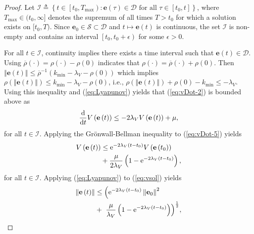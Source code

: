 \documentclass[letterpaper, 10 pt, conference]{ieeeconf}
\theoremstyle{definition}
\begin{document}
\begin{proof}
Let $\mathcal{I}\triangleq\left\{ t\in\left[t_{0},T_{\max}\right):\mathbf{e}\left(\tau\right)\in\mathcal{D}\text{ for all }\tau\in\left[t_{0},t\right]\right\} $, where $T_{\max}\in(t_{0},\infty ]$ denotes the supremum of all times $T>t_{0}$ for which a solution exists on $[t_{0},T)$. Since $\mathbf{e}_{0} \in\mathcal{S}\subset\mathcal{D}$
and $t\mapsto \mathbf{e}\left(t\right)$ is continuous, the set $\mathcal{I}$
is non-empty and contains an interval $\left[t_{0},t_{0}+\epsilon\right)$
for some $\epsilon>0$.

For all $t\in\mathcal{I}$, continuity implies there exists a time interval such that $\mathbf{e}\left(t\right)\in\mathcal{D}$. Using $\overline{\rho}\left(\cdot\right)=\rho\left(\cdot\right)-\rho\left(0\right)$
indicates that $\rho\left(\cdot\right)=\overline{\rho}\left(\cdot\right)+\rho\left(0\right)$. Then $\left\Vert \mathbf{e}\left(t\right)\right\Vert \leq\overline{\rho}^{-1}\left(k_{\min}-\lambda_{V}-\rho\left(0\right)\right)$
which implies $\rho\left(\left\Vert \mathbf{e}\left(t\right)\right\Vert \right)\leq k_{\min}-\lambda_{V}-\rho\left(0\right)$, 
i.e., $\rho\left(\left\Vert \mathbf{e}\left(t\right)\right\Vert \right)+\rho\left(0\right)-k_{\min}\leq-\lambda_{V}$.
Using this inequality and (\ref{eq:Lyapunov}) yields that  (\ref{eq:vDot-2}) is bounded above as
\begin{equation}
\frac{{\rm d}}{{\rm d}t}V\left(\mathbf{e}\left(t\right)\right) \leq-2\lambda_{V}V\left(\mathbf{e}\left(t\right)\right)+\mu,
\label{eq:vDot-5}
\end{equation}
for all $t\in\mathcal{I}$. Applying the Grönwall-Bellman inequality
to (\ref{eq:vDot-5}) yields
\begin{equation}
\begin{aligned}V\left(\mathbf{e}\left(t\right)\right) & \leq{\rm e}^{-2\lambda_{V}\left(t-t_{0}\right)}V\left(\mathbf{e}\left(t_{0}\right)\right) \\
&+\frac{\mu}{2\lambda_{V}}\left(1-{\rm e}^{-2\lambda_{V}\left(t-t_{0}\right)}\right),\end{aligned}
\label{eq:vsol}
\end{equation}
for all $t\in\mathcal{I}$. Applying (\ref{eq:Lyapunov}) to (\ref{eq:vsol}) yields
\begin{equation}\label{eq: final bound}
    \begin{aligned}
        \left\Vert \mathbf{e}\left(t\right)\right\Vert &\leq\Bigl({\rm e}^{-2\lambda_{V}\left(t-t_{0}\right)}\left\Vert \mathbf{e}_{0}\right\Vert ^{2}\\
        &+\text{ }\frac{\mu}{\lambda_{V}}\left(1-{\rm e}^{-2\lambda_{V}\left(t-t_{0}\right)}\right)\Bigr)^{\frac{1}{2}},

\end{aligned}
\end{equation}
\end{proof}
\end{document}
